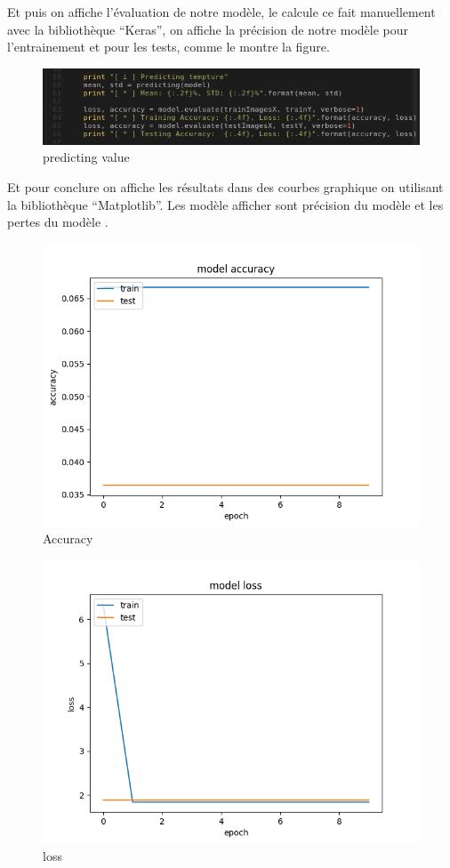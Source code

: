 \documentclass[12pt]{article}
\begin{document}
Et puis on affiche l’évaluation de notre modèle, le calcule ce fait manuellement avec la bibliothèque “Keras”, on affiche la précision de notre modèle pour l’entrainement et pour les tests, comme le montre la figure.

\begin{figure}[h]
	\centering
	\includegraphics[width=15cm]{img-Chapiter-4/predicting_value.png}
	\caption{predicting value}
\end{figure}

Et pour conclure on affiche les résultats dans des courbes graphique on utilisant la bibliothèque “Matplotlib”. Les modèle afficher sont précision du modèle et les pertes du modèle .
\newpage
\begin{figure}[h]
	\centering
	\includegraphics[width=15cm]{img-Chapiter-4/Figure_1.png}
	\caption{Accuracy}
\end{figure}

\newpage
\begin{figure}[h]
	\centering
	\includegraphics[width=15cm]{img-Chapiter-4/Figure_1-1.png}
	\caption{loss}
\end{figure}


\newpage
{}
	

	
\end{document}

